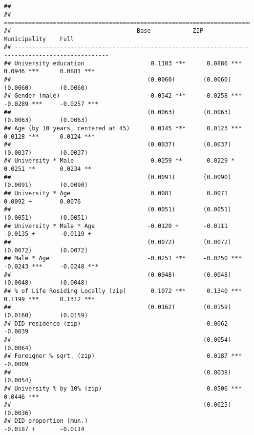 \documentclass[
]{article}
\begin{document}
\begin{verbatim}
## 
## =================================================================================================
##                                    Base            ZIP             Municipality    Full          
## -------------------------------------------------------------------------------------------------
## University education                   0.1103 ***      0.0886 ***      0.0946 ***      0.0881 ***
##                                       (0.0060)        (0.0060)        (0.0060)        (0.0060)   
## Gender (male)                         -0.0342 ***     -0.0258 ***     -0.0289 ***     -0.0257 ***
##                                       (0.0063)        (0.0063)        (0.0063)        (0.0063)   
## Age (by 10 years, centered at 45)      0.0145 ***      0.0123 ***      0.0128 ***      0.0124 ***
##                                       (0.0037)        (0.0037)        (0.0037)        (0.0037)   
## University * Male                      0.0259 **       0.0229 *        0.0251 **       0.0234 ** 
##                                       (0.0091)        (0.0090)        (0.0091)        (0.0090)   
## University * Age                       0.0081          0.0071          0.0092 +        0.0076    
##                                       (0.0051)        (0.0051)        (0.0051)        (0.0051)   
## University * Male * Age               -0.0120 +       -0.0111         -0.0135 +       -0.0119 +  
##                                       (0.0072)        (0.0072)        (0.0072)        (0.0072)   
## Male * Age                            -0.0251 ***     -0.0250 ***     -0.0243 ***     -0.0248 ***
##                                       (0.0048)        (0.0048)        (0.0048)        (0.0048)   
## % of Life Residing Locally (zip)       0.1072 ***      0.1340 ***      0.1199 ***      0.1312 ***
##                                       (0.0162)        (0.0159)        (0.0160)        (0.0159)   
## DID residence (zip)                                   -0.0062                         -0.0039    
##                                                       (0.0054)                        (0.0064)   
## Foreigner % sqrt. (zip)                                0.0187 ***                     -0.0009    
##                                                       (0.0038)                        (0.0054)   
## University % by 10% (zip)                              0.0506 ***                      0.0446 ***
##                                                       (0.0025)                        (0.0036)   
## DID proportion (mun.)                                                 -0.0187 +       -0.0114    

\end{verbatim}
\end{document}

